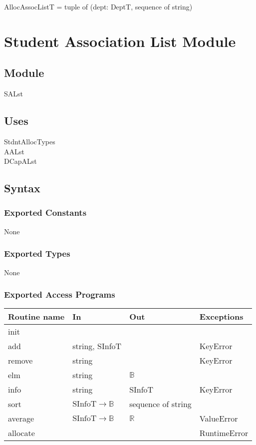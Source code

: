 \documentclass[12pt]{article}
\begin{document}
AllocAssocListT = tuple of (dept: DeptT, sequence of string)

\newpage

\section* {Student Association List Module}

\subsection*{Module}

SALst

\subsection* {Uses}

StdntAllocTypes\\
AALst\\
DCapALst

\subsection* {Syntax}

\subsubsection* {Exported Constants}

None

\subsubsection* {Exported Types}

None

\subsubsection* {Exported Access Programs}

\begin{tabular}{| l | l | l | p{5cm} |}
\hline
\textbf{Routine name} & \textbf{In} & \textbf{Out} & \textbf{Exceptions}\\
\hline
init & ~ & ~ & ~\\
\hline
add & string, SInfoT & ~ & KeyError\\
\hline
remove & string & ~ & KeyError\\
\hline
elm & string & $\mathbb{B}$ & ~\\
\hline
info & string & SInfoT & KeyError\\
\hline
sort & $\text{SInfoT} \rightarrow \mathbb{B}$ & sequence of string & ~\\
\hline
average & $\text{SInfoT} \rightarrow \mathbb{B}$ & $\mathbb{R}$ & ValueError\\
\hline
allocate & ~ & ~ & RuntimeError\\
\hline

\end{tabular}
\end{document}
